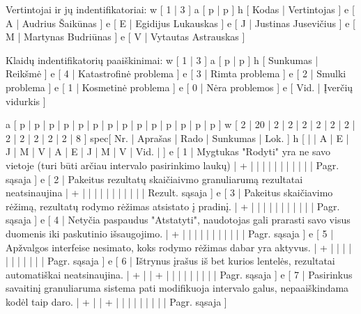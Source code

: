 Vertintojai ir jų indentifikatoriai:
\xtableu
{
  w [ 1 | 3 ]
  a [ p | p ]
  h [ Kodas | Vertintojas ]
  e [ A | Audrius Šaikūnas ]
  e [ E | Egidijus Lukauskas ]
  e [ J | Justinas Jusevičius ]
  e [ M | Martynas Budriūnas ]
  e [ V | Vytautas Astrauskas ]
}

Klaidų indentifikatorių paaiškinimai:
\xtableu
{
  w [ 1 | 3 ]
  a [ p | p ]
  h [ Sunkumas | Reikšmė ]
  e [ 4 | Katastrofinė problema ]
  e [ 3 | Rimta problema ]
  e [ 2 | Smulki problema ]
  e [ 1 | Kosmetinė problema ]
  e [ 0 | Nėra problemos ]
  e [ Vid. | Įverčių vidurkis ]
}

\xtableu
{
  a [ p   | p       | p | p | p | p | p | p | p | p | p | p | p    | p    ]
  w [ 2   | 20      | 2 | 2 | 2 | 2 | 2 | 2 | 2 | 2 | 2 | 2 | 2    | 8    ]
spec[ Nr. | Aprašas | Rado              | Sunkumas                 | Lok. ]
  h [     |         | A | E | J | M | V | A | E | J | M | V | Vid. |      ]
  e [ 1   | Mygtukas "Rodyti" yra ne savo vietoje (turi būti arčiau intervalo 
  pasirinkimo laukų)
                    | + |   |   |   |   |   |   |   |   |   |      | Pagr. sąsaja ]
  e [ 2   | Pakeitus rezultatų skaičiaivmo granuliarumą rezultatai neatsinaujina
                    | + |   |   |   |   |   |   |   |   |   |      | Rezult. sąsaja ]
  e [ 3   | Pakeitus skaičiavimo rėžimą, rezultatų rodymo rėžimas atsistato
  į pradinį.
                    | + |   |   |   |   |   |   |   |   |   |      | Pagr. sąsaja ]
  e [ 4   | Netyčia paspaudus "Atstatyti", naudotojas gali prarasti savo visus duomenis
  iki paskutinio išsaugojimo. 
                    | + |   |   |   |   |   |   |   |   |   |      | Pagr. sąsaja ]
  e [ 5   | Apžvalgos interfeise nesimato, koks rodymo rėžimas dabar yra aktyvus.
                    | + |   |   |   |   |   |   |   |   |   |      | Pagr. sąsaja ]
  e [ 6   | Ištrynus įrašus iš bet kurios lentelės, rezultatai automatiškai neatsinaujina.
                    | + |   | + |   |   |   |   |   |   |   |      | Pagr. sąsaja ]
  e [ 7   | Pasirinkus savaitinį granuliaruma sistema pati modifikuoja intervalo galus,
  nepaaiškindama kodėl taip daro.
                    | + |   | + |   |   |   |   |   |   |   |      | Pagr. sąsaja ]


}
